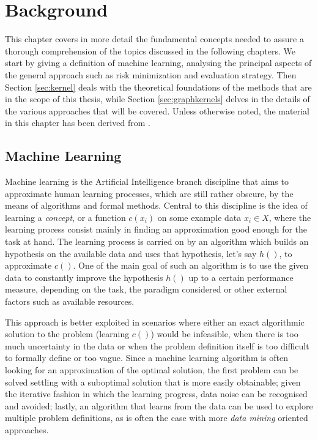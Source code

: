 
\chapter{Background} %
This chapter covers in more detail the fundamental concepts needed to assure a
thorough comprehension of the topics discussed in the following chapters.
We start by giving a definition of machine learning, analysing the 
principal aspects of the general approach such as risk minimization and evaluation
strategy.
Then Section \ref{sec:kernel} deals with the theoretical foundations of the 
methods that are in the scope of this thesis, while Section \ref{sec:graphkernels}
delves in the details of the various approaches that will be covered.
Unless otherwise noted, the material in this chapter has been derived
from \cite{nnavarin, rtesselli}.

\label{Chapter2} %

\section{Machine Learning}

Machine learning is the Artificial Intelligence branch discipline that aims
to approximate human learning processes, which are still rather obscure,
by the means of algorithms and formal methods.
Central to this discipline is the idea of learning a \emph{concept}, or a function
$c(x_i)$ on some example data $x_i \in X$, where the learning process consist
mainly in finding an approximation good enough for the task at hand.
The learning process is carried on by an algorithm which builds an hypothesis
on the available data and uses that hypothesis, let's say $h()$,  to approximate
$c()$.
One of the main goal of such an algorithm is to use the given data to constantly
improve the hypothesis $h()$ up to a certain performance measure, depending
on the task, the paradigm considered or other external factors such as available
resources.

This approach is better exploited in scenarios where either an exact
algorithmic solution to the problem (learning $c()$) would be infeasible, when
there is too much uncertainty in the data or when the problem definition itself
is too difficult to formally define or too vague.
Since a machine learning algorithm is often looking for an approximation of the 
optimal solution, the first problem can be solved settling with a suboptimal
solution that is more easily obtainable; given the iterative fashion in which
the learning progress, data noise can be recognised and avoided; lastly,
an algorithm that learns from the data can be used to explore multiple problem
definitions, as is often the case with more \emph{data mining} oriented approaches.

